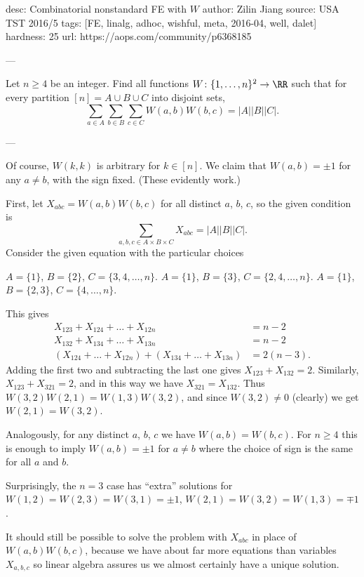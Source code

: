 desc:  Combinatorial nonstandard FE with $W$
author: Zilin Jiang
source:  USA TST 2016/5
tags:  [FE, linalg, adhoc, wishful, meta, 2016-04, well, dalet]
hardness: 25
url: https://aops.com/community/p6368185

---

Let $n \ge 4$ be an integer.
Find all functions $W \colon \{1, \dots, n\}^2 \to \RR$ such that
for every partition $[n] = A \cup B \cup C$ into disjoint sets,
\[ \sum_{a \in A} \sum_{b \in B} \sum_{c \in C} W(a,b) W(b,c)
= |A| |B| |C|. \]

---

Of course, $W(k,k)$ is arbitrary for $k \in [n]$.
We claim that $W(a,b) = \pm 1$ for any $a \neq b$, with the sign fixed.
(These evidently work.)

First, let $X_{abc} = W(a,b)W(b,c)$ for all distinct $a$, $b$, $c$,
so the given condition is
\[ \sum_{a,b,c \in A \times B \times C} X_{abc} = |A| |B| |C|. \]
Consider the given equation with the particular choices
\begin{itemize}
  \ii $A = \{1\}$, $B = \{2\}$, $C = \{3,4,\dots,n\}$.
  \ii $A = \{1\}$, $B = \{3\}$, $C = \{2,4,\dots,n\}$.
  \ii $A = \{1\}$, $B = \{2,3\}$, $C = \{4,\dots,n\}$.
\end{itemize}
This gives
\begin{align*}
  X_{123} + X_{124} + \dots + X_{12n} &= n-2 \\
  X_{132} + X_{134} + \dots + X_{13n} &= n-2 \\
  (X_{124} + \dots + X_{12n})
  + (X_{134} + \dots + X_{13n}) &= 2(n-3).
\end{align*}
Adding the first two and
subtracting the last one gives $X_{123} + X_{132} = 2$.
Similarly, $X_{123} + X_{321} = 2$,
and in this way we have $X_{321} = X_{132}$.
Thus $W(3,2)W(2,1) = W(1,3)W(3,2)$,
and since $W(3,2) \neq 0$ (clearly) we get $W(2,1) = W(3,2)$.

Analogously, for any distinct $a$, $b$, $c$ we have $W(a,b) = W(b,c)$.
For $n \ge 4$ this is enough to imply $W(a,b) = \pm 1$ for $a \neq b$
where the choice of sign is the same for all $a$ and $b$.

\begin{remark*}
Surprisingly, the $n = 3$ case has ``extra'' solutions for
$W(1,2) = W(2,3) = W(3,1) = \pm1$,
$W(2,1) = W(3,2) = W(1,3) = \mp1$.
\end{remark*}
\begin{remark*}
[Intuition]
It should still be possible to solve the problem
with $X_{abc}$ in place of $W(a,b) W(b,c)$,
because we have about far more equations than variables $X_{a,b,c}$
so linear algebra assures us we almost certainly have a unique solution.
\end{remark*}

